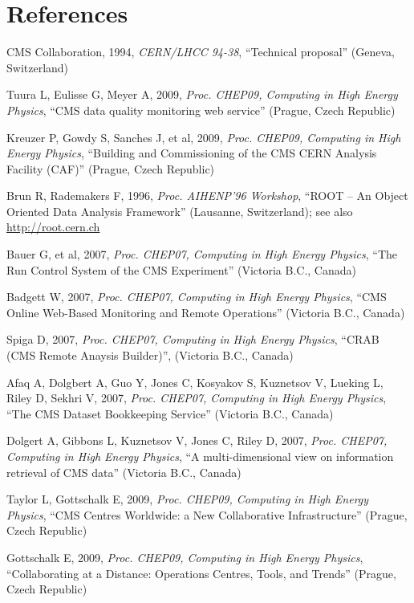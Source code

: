 \documentclass[a4paper]{jpconf}
\begin{document}
\section*{References}
\begin{thebibliography}{9}

  CMS Collaboration,
  1994, {\it CERN/LHCC 94-38},
  ``Technical proposal''
  (Geneva, Switzerland)

  Tuura L, Eulisse G, Meyer A,
  2009, {\it Proc. CHEP09, Computing in High Energy Physics},
  ``CMS data quality monitoring web service''
  (Prague, Czech Republic)

  Kreuzer P, Gowdy S, Sanches J, et al,
  2009, {\it Proc. CHEP09, Computing in High Energy Physics},
  ``Building and Commissioning of the CMS CERN Analysis Facility (CAF)''
  (Prague, Czech Republic)

  Brun R, Rademakers F, 1996, {\it Proc. AIHENP'96 Workshop},
  ``ROOT -- An Object Oriented Data Analysis Framework''
  (Lausanne, Switzerland); see also \url{http://root.cern.ch}

  Bauer G, et al,
  2007, {\it Proc. CHEP07, Computing in High Energy Physics},
  ``The Run Control System of the CMS Experiment''
  (Victoria B.C., Canada)

  Badgett W,
  2007, {\it Proc. CHEP07, Computing in High Energy Physics},
  ``CMS Online Web-Based Monitoring and Remote Operations''
  (Victoria B.C., Canada)

  Spiga D,
  2007, {\it Proc. CHEP07, Computing in High Energy Physics},
  ``CRAB (CMS Remote Anaysis Builder)'',
  (Victoria B.C., Canada)

  Afaq A, Dolgbert A, Guo Y, Jones C, Kosyakov S,
  Kuznetsov V, Lueking L, Riley D, Sekhri V,
  2007, {\it Proc. CHEP07, Computing in High Energy Physics},
  ``The CMS Dataset Bookkeeping Service''
  (Victoria B.C., Canada)

  Dolgert A, Gibbons L, Kuznetsov V, Jones C, Riley D,
  2007, {\it Proc. CHEP07, Computing in High Energy Physics},
  ``A multi-dimensional view on information retrieval of CMS data''
  (Victoria B.C., Canada)

  Taylor L, Gottschalk E,
  2009, {\it Proc. CHEP09, Computing in High Energy Physics},
  ``CMS Centres Worldwide: a New Collaborative Infrastructure''
  (Prague, Czech Republic)

  Gottschalk E,
  2009, {\it Proc. CHEP09, Computing in High Energy Physics},
  ``Collaborating at a Distance: Operations Centres, Tools, and Trends''
  (Prague, Czech Republic)

\end{thebibliography}
\end{document}
